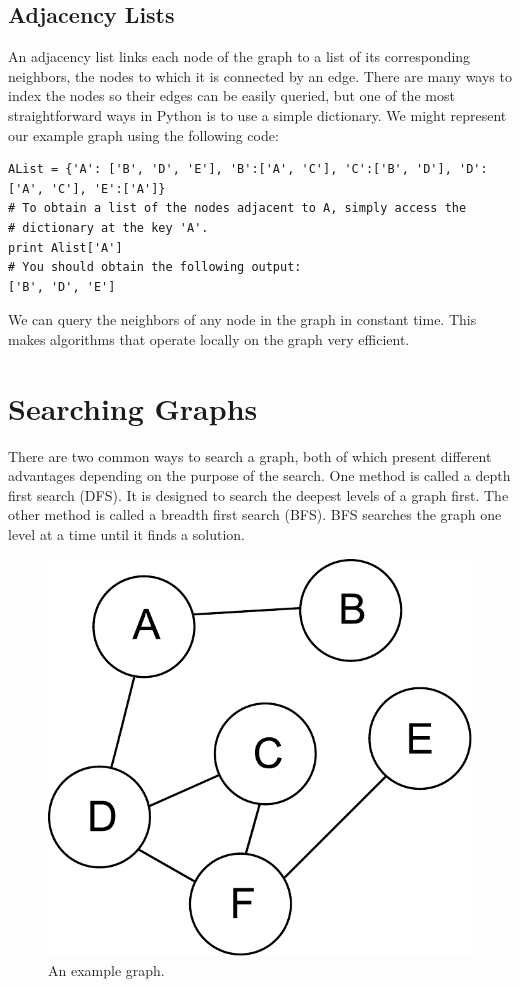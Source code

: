 \subsection*{Adjacency Lists}
An adjacency list links each node of the graph to a list of its corresponding neighbors, the nodes to which it is connected by an edge.
There are many ways to index the nodes so their edges can be easily queried, but one of the most straightforward ways in Python is to use a simple dictionary. We might represent our example graph using the following code:
\begin{lstlisting}
AList = {'A': ['B', 'D', 'E'], 'B':['A', 'C'], 'C':['B', 'D'], 'D':['A', 'C'], 'E':['A']}
# To obtain a list of the nodes adjacent to A, simply access the 
# dictionary at the key 'A'.
print Alist['A']
# You should obtain the following output:
['B', 'D', 'E']
\end{lstlisting}
We can query the neighbors of any node in the graph in constant time.
This makes algorithms that operate locally on the graph very efficient.

\section*{Searching Graphs}
There are two common ways to search a graph, both of which present different advantages depending on the purpose of the search.
One method is called a depth first search (DFS).  It is designed to search the deepest levels of a graph first.
The other method is called a breadth first search (BFS).  BFS searches the graph one level at a time until it finds a solution.
\begin{figure}[h]
\centering
\includegraphics[width=.5\textwidth]{graph.pdf}
\caption{An example graph.}
\label{fig:bfs_dfs_graph}
\end{figure}


